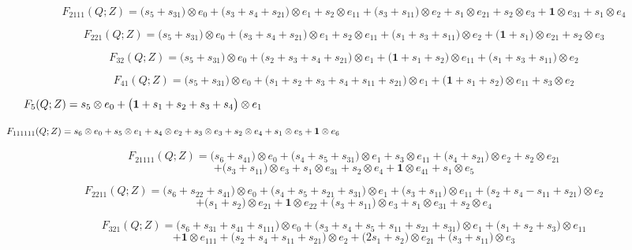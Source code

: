 \documentclass[12pt]{amsart}
\theoremstyle{plain}
\theoremstyle{definition}
\theoremstyle{remark}
\begin{document}
$$F_{ 2111 }(Q;Z)=
\big( s_{5} + s_{31} \big) \otimes e_{ 0 }
+\big( s_{3} + s_{4} + s_{21} \big) \otimes e_{ 1 }
+ s_{2} \otimes e_{ 11 }
+\big( s_{3} + s_{11} \big) \otimes e_{ 2 }
+ s_{1} \otimes e_{ 21 }
+ s_{2} \otimes e_{ 3 }
+ \boldsymbol{1} \otimes e_{ 31 }
+ s_{1} \otimes e_{ 4 }
$$

$$F_{ 221 }(Q;Z)=
\big( s_{5} + s_{31} \big) \otimes e_{ 0 }
+\big( s_{3} + s_{4} + s_{21} \big) \otimes e_{ 1 }
+ s_{2} \otimes e_{ 11 }
+\big( s_{1} + s_{3} + s_{11} \big) \otimes e_{ 2 }
+\big( \boldsymbol{1} + s_{1} \big) \otimes e_{ 21 }
+ s_{2} \otimes e_{ 3 }
$$

$$F_{ 32 }(Q;Z)=
\big( s_{5} + s_{31} \big) \otimes e_{ 0 }
+\big( s_{2} + s_{3} + s_{4} + s_{21} \big) \otimes e_{ 1 }
+\big( \boldsymbol{1} + s_{1} + s_{2} \big) \otimes e_{ 11 }
+\big( s_{1} + s_{3} + s_{11} \big) \otimes e_{ 2 }
$$

$$F_{ 41 }(Q;Z)=
\big( s_{5} + s_{31} \big) \otimes e_{ 0 }
+\big( s_{1} + s_{2} + s_{3} + s_{4} + s_{11} + s_{21} \big) \otimes e_{ 1 }
+\big( \boldsymbol{1} + s_{1} + s_{2} \big) \otimes e_{ 11 }
+ s_{3} \otimes e_{ 2 }
$$

$$F_{ 5 }(Q;Z)=
s_{5} \otimes e_{ 0 }
+\big( \boldsymbol{1} + s_{1} + s_{2} + s_{3} + s_{4} \big) \otimes e_{ 1 }
\hskip 5in \   $$

$$F_{ 111111 }(Q;Z)=
s_{6} \otimes e_{ 0 }
+ s_{5} \otimes e_{ 1 }
+ s_{4} \otimes e_{ 2 }
+ s_{3} \otimes e_{ 3 }
+ s_{2} \otimes e_{ 4 }
+ s_{1} \otimes e_{ 5 }
+ \boldsymbol{1} \otimes e_{ 6 }
 \hskip 5in \  $$

$$F_{ 21111 }(Q;Z)=
\big( s_{6} + s_{41} \big) \otimes e_{ 0 }
+\big( s_{4} + s_{5} + s_{31} \big) \otimes e_{ 1 }
+ s_{3} \otimes e_{ 11 }
+\big( s_{4} + s_{21} \big) \otimes e_{ 2 }
+ s_{2} \otimes e_{ 21 } $$ $$
+\big( s_{3} + s_{11} \big) \otimes e_{ 3 }
+ s_{1} \otimes e_{ 31 }
+ s_{2} \otimes e_{ 4 }
+ \boldsymbol{1} \otimes e_{ 41 }
+ s_{1} \otimes e_{ 5 }
$$

$$F_{ 2211 }(Q;Z)=
\big( s_{6} + s_{22} + s_{41} \big) \otimes e_{ 0 }
+\big( s_{4} + s_{5} + s_{21} + s_{31} \big) \otimes e_{ 1 }
+\big( s_{3} + s_{11} \big) \otimes e_{ 11 }
+\big( s_{2} + s_{4} - s_{11} + s_{21} \big) \otimes e_{ 2 } $$ $$
+\big( s_{1} + s_{2} \big) \otimes e_{ 21 }
+ \boldsymbol{1} \otimes e_{ 22 }
+\big( s_{3} + s_{11} \big) \otimes e_{ 3 }
+ s_{1} \otimes e_{ 31 }
+ s_{2} \otimes e_{ 4 }
$$

$$F_{ 321 }(Q;Z)=
\big( s_{6} + s_{31} + s_{41} + s_{111} \big) \otimes e_{ 0 }
+\big( s_{3} + s_{4} + s_{5} + s_{11} + s_{21} + s_{31} \big) \otimes e_{ 1 }
+\big( s_{1} + s_{2} + s_{3} \big) \otimes e_{ 11 } $$ $$
+ \boldsymbol{1} \otimes e_{ 111 }
+\big( s_{2} + s_{4} + s_{11} + s_{21} \big) \otimes e_{ 2 }
+\big( 2 s_{1} + s_{2} \big) \otimes e_{ 21 }
+\big( s_{3} + s_{11} \big) \otimes e_{ 3 }
$$
\end{document}
